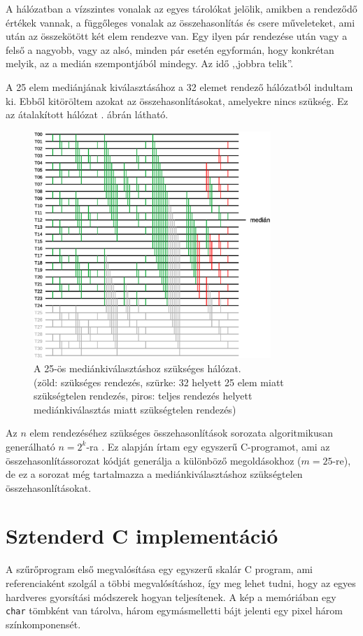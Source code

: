 		A hálózatban a vízszintes vonalak az egyes tárolókat jelölik, amikben a rendeződő értékek vannak, a függőleges vonalak az összehasonlítás és csere műveleteket, ami után az összekötött két elem rendezve van. Egy ilyen pár rendezése után vagy a felső a nagyobb, vagy az alsó, minden pár esetén egyformán, hogy konkrétan melyik, az a medián szempontjából mindegy. Az idő ,,jobbra telik''.

		A 25 elem mediánjának kiválasztásához a 32 elemet rendező hálózatból indultam ki. Ebből kitöröltem azokat az összehasonlításokat, amelyekre nincs szükség. Ez az átalakított hálózat . ábrán látható.
		\begin{figure}[h]
			\centering
			\includegraphics[width=0.8\textwidth]{kep/median25.eps}
			\caption{A 25-ös mediánkiválasztáshoz szükséges hálózat.\\ (zöld: szükséges rendezés, szürke: 32 helyett 25 elem miatt szükségtelen rendezés, piros: teljes rendezés helyett mediánkiválasztás miatt szükségtelen rendezés)}
			\label{fig:median25}
		\end{figure}

		Az $n$ elem rendezéséhez szükséges összehasonlítások sorozata algoritmikusan generálható $n=2^k$-ra \cite{batcher}. Ez alapján írtam egy egyszerű C-programot, ami az összehasonlítássorozat kódját generálja a különböző megoldásokhoz ($m=25$-re), de ez a sorozat még tartalmazza a mediánkiválasztáshoz szükségtelen összehasonlításokat.
		

	\section{Sztenderd C implementáció}
		A szűrőprogram első megvalósítása egy egyszerű skalár C program, ami referenciaként szolgál a többi megvalósításhoz, így meg lehet tudni, hogy az egyes hardveres gyorsítási módszerek hogyan teljesítenek. A kép a memóriában egy \verb|char| tömbként van tárolva, három egymásmelletti bájt jelenti egy pixel három színkomponensét.


